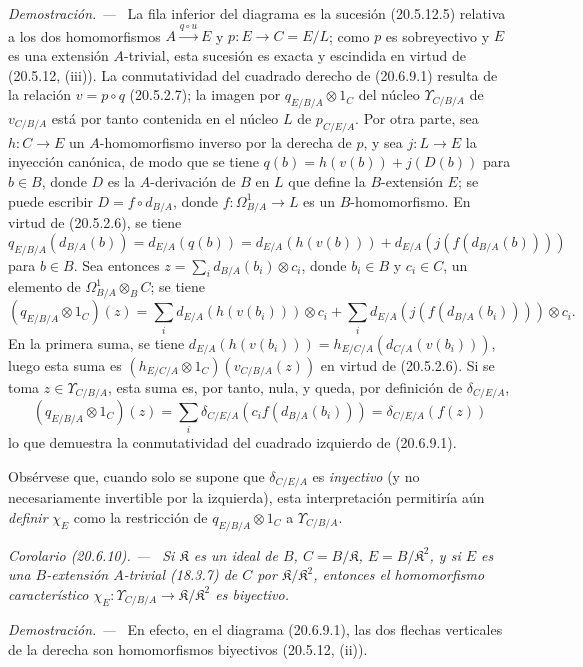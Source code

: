 \documentclass[10pt,oneside]{book}
\makeatletter
\newcommand{\setmanualcurrentlabel}[1]{\def\@currentlabel{#1}}
\newcommand{\oldpage}[2][]{%
  \setcounter{footnote}{0}%
  \marginpar{\scriptsize\textbf{#1}~|~#2}\ignorespaces}
\newenvironment{corollary}[1][]{%
  \setmanualcurrentlabel{#1}\par\medskip\noindent\itshape Corolario (#1). ---\ }{\par}
\newenvironment{proof}{%
  \par\medskip\noindent\textit{Demostración. ---\ }}{\par}
\makeatother
\begin{document}
\begin{proof}
La fila inferior del diagrama es la sucesión (20.5.12.5) relativa a los
dos homomorfismos $A\xrightarrow{q\circ u}E$ y
$p:E\to C=E/L$; como $p$ es sobreyectivo y $E$ es una extensión
$A$-trivial, esta sucesión es exacta y escindida en virtud de (20.5.12,
(iii)). La conmutatividad del cuadrado derecho de (20.6.9.1) resulta de la
relación $v=p\circ q$ (20.5.2.7); la imagen por
$q_{E/B/A}\otimes1_C$ del núcleo $\Upsilon_{C/B/A}$ de $v_{C/B/A}$ está
por tanto contenida en el núcleo $L$ de $p_{C/E/A}$. Por otra parte, sea
$h:C\to E$ un $A$-homomorfismo inverso por la derecha de $p$, y sea
$j:L\to E$ la inyección canónica, de modo que se tiene
$q(b)=h(v(b))+j(D(b))$ para $b\in B$, donde $D$ es la $A$-derivación de
$B$ en $L$ que define la $B$-extensión $E$; se puede escribir
$D=f\circ d_{B/A}$, donde $f:\Omega^1_{B/A}\to L$ es un
$B$-homomorfismo. En virtud de (20.5.2.6), se tiene
\[
  q_{E/B/A}(d_{B/A}(b))=d_{E/A}(q(b))
  =d_{E/A}(h(v(b)))+d_{E/A}(j(f(d_{B/A}(b))))
\]
para $b\in B$. Sea entonces
$z=\sum_i d_{B/A}(b_i)\otimes c_i$, donde $b_i\in B$ y $c_i\in C$, un
elemento de $\Omega^1_{B/A}\otimes_B C$; se tiene
\[
  (q_{E/B/A}\otimes1_C)(z)=
  \sum_i d_{E/A}(h(v(b_i)))\otimes c_i+
  \sum_i d_{E/A}(j(f(d_{B/A}(b_i))))\otimes c_i.
\]
En la primera suma, se tiene
$d_{E/A}(h(v(b_i)))=h_{E/C/A}(d_{C/A}(v(b_i)))$, luego esta suma es
$(h_{E/C/A}\otimes1_C)(v_{C/B/A}(z))$ en virtud de (20.5.2.6). Si se
toma $z\in\Upsilon_{C/B/A}$, esta suma es, por tanto, nula, y queda,
por definición de $\delta_{C/E/A}$,
\[
  (q_{E/B/A}\otimes1_C)(z)=
  \sum_i\delta_{C/E/A}(c_i f(d_{B/A}(b_i)))
  =\delta_{C/E/A}(f(z))
\]
lo que demuestra la conmutatividad del cuadrado izquierdo de (20.6.9.1).
\end{proof}

Obsérvese que, cuando solo se supone que $\delta_{C/E/A}$ es
\emph{inyectivo} (y no necesariamente invertible por la izquierda), esta
interpretación permitiría aún \emph{definir} $\chi_E$ como la
restricción de $q_{E/B/A}\otimes1_C$ a $\Upsilon_{C/B/A}$.

\begin{corollary}[20.6.10]
\label{0.20.6.10-es}
Si $\mathfrak K$ es un ideal de $B$, $C=B/\mathfrak K$,
$E=B/\mathfrak K^2$, y si $E$ es una $B$-extensión $A$-trivial
\textup{(18.3.7)} de $C$ por $\mathfrak K/\mathfrak K^2$, entonces
el homomorfismo característico
$\chi_E:\Upsilon_{C/B/A}\to\mathfrak K/\mathfrak K^2$ es biyectivo.
\end{corollary}
\begin{proof}
\oldpage[0\textsubscript{IV-1}]{140}
En efecto, en el diagrama (20.6.9.1), las dos flechas verticales de la
derecha son homomorfismos biyectivos (20.5.12, (ii)).
\end{proof}
\end{document}
